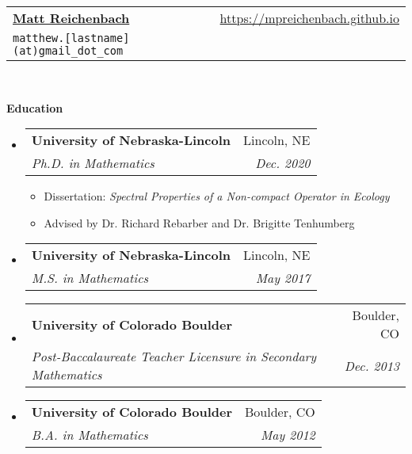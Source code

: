\documentclass[letterpaper,11pt]{article}
\makeatletter
\newcommand{\resitem}[1]{\item #1 \vspace{-2pt}}
\newcommand{\resheading}[1]{{\large \colorbox{mygrey}{\begin{minipage}{\textwidth}{\textbf{#1 \vphantom{p\^{E}}}}\end{minipage}}}}
\newcommand{\ressubheading}[4]{
\begin{tabular*}{6.5in}{l@{\extracolsep{\fill}}r}
		\textbf{#1} & #2 \\
		\textit{#3} & \textit{#4} \\
\end{tabular*}\vspace{-6pt}}
\makeatother
\begin{document}
\thispagestyle{empty}
\newcommand{\mywebheader}{
\begin{tabular*}{7in}{l@{\extracolsep{\fill}}r}
	\textbf{\href{}{\LARGE Matt Reichenbach}} & \url{https://mpreichenbach.github.io} \\
    \texttt{matthew.[lastname](at)gmail\_dot\_com} \\
	\end{tabular*}
\\
\vspace{0.1in}}

\mywebheader

\resheading{Education}
\begin{itemize}
	\item
	\ressubheading{University of Nebraska-Lincoln}{Lincoln, NE}{Ph.D. in Mathematics}{Dec. 2020}
	{ \footnotesize
		\begin{itemize}
			\resitem{Dissertation: \emph{Spectral Properties of a Non-compact Operator in Ecology}}
			\resitem{Advised by Dr. Richard Rebarber and Dr. Brigitte Tenhumberg}
	\end{itemize}}
	\item
	\ressubheading{University of Nebraska-Lincoln}{Lincoln, NE}{M.S. in Mathematics}{May 2017}
	\item
	\ressubheading{University of Colorado Boulder}{Boulder, CO}{Post-Baccalaureate Teacher Licensure in Secondary Mathematics}{Dec. 2013}
	\item
	\ressubheading{University of Colorado Boulder}{Boulder, CO}{B.A. in Mathematics}{May 2012}
	
\end{itemize}
\end{document}
